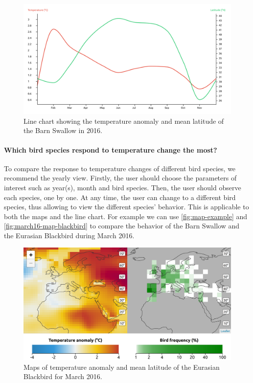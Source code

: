 \documentclass[journal]{vgtc}                %
\begin{document}
\begin{figure}[t]
  \centering
  \includegraphics[width=\linewidth]{monthly-graph16-barnswallow}
    \caption{Line chart showing the temperature anomaly and mean latitude of the Barn Swallow in 2016.}
  \label{fig:monthly-graph16}
\end{figure}

\paragraph{Which bird species respond to temperature change the most?}

To compare the response to temperature changes of different bird species, we recommend the yearly view. Firstly, the user should choose the parameters of interest such as year(s), month and bird species. Then, the user should observe each species, one by one. At any time, the user can change to a different bird species, thus allowing to view the different species' behavior. This is applicable to both the maps and the line chart. For example we can use \autoref{fig:map-example} and \autoref{fig:march16-map-blackbird} to compare the behavior of the Barn Swallow and the Eurasian Blackbird during March 2016.

\begin{figure}[t]
  \centering
  \includegraphics[width=\linewidth]{march16-map-blackbird}
  \caption{Maps of temperature anomaly and mean latitude of the Eurasian Blackbird for March 2016.}
  \label{fig:march16-map-blackbird}
\end{figure}
\end{document}
